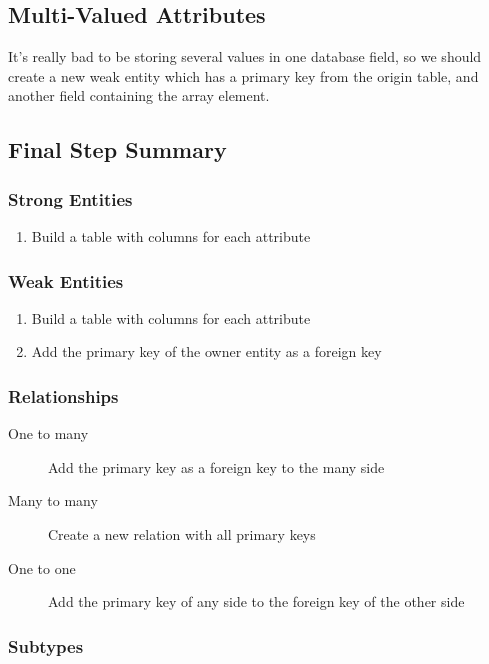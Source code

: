 \subsection{Multi-Valued Attributes}\label{sub:multi_valued_attributes}

It's really bad to be storing several values in one database field, so we should create a new weak entity which has a primary key from the origin table, and another field containing the array element.

\subsection{Final Step Summary}\label{sub:final_step_summary}

\subsubsection{Strong Entities}\label{ssub:strong_entities}

\begin{enumerate}
    \item Build a table with columns for each attribute
\end{enumerate}
\subsubsection{Weak Entities}\label{ssub:weak_entities}

\begin{enumerate}
    \item Build a table with columns for each attribute
    \item Add the primary key of the owner entity as a foreign key
\end{enumerate}
\subsubsection{Relationships}\label{ssub:relationships_dsr_four}

\begin{description}
    \item[One to many] Add the primary key as a foreign key to the many side
    \item[Many to many] Create a new relation with all primary keys
    \item[One to one] Add the primary key of any side to the foreign key of the other side
\end{description}
\subsubsection{Subtypes}\label{ssub:subtypes}

